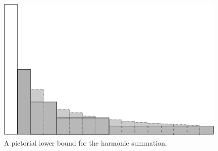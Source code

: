 \begin{figure}[htb]
\centerline{
\includegraphics[scale=0.3]{FiguresMaths/HarmonicSumLowerbound}
}
\caption{A pictorial lower bound for the harmonic summation.}
\label{fig:HarmonicSumLowerbound}
\end{figure}



